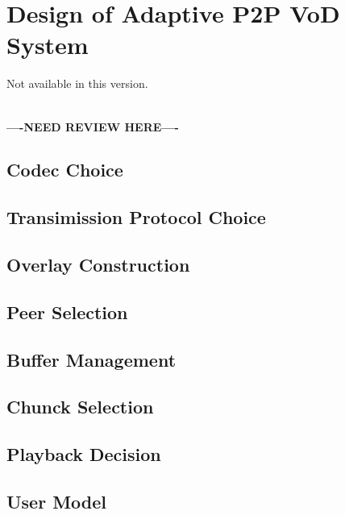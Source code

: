 \documentclass[11pt,a4paper]{article}
\newcommand{\question}{\textbf{\\----NEED REVIEW HERE----\\}}
\begin{document}
\section{Design of Adaptive P2P VoD System}
\label{sec:p2p_vod}

Not available in this version. 

\question

\subsection{Codec Choice}

\subsection{Transimission Protocol Choice}


\subsection{Overlay Construction}


%


\subsection{Peer Selection}


\subsection{Buffer Management}


\subsection{Chunck Selection}

%



\subsection{Playback Decision}


\subsection{User Model}
\end{document}
